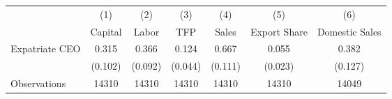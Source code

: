 \begin{tabular}{l*{6}{c}}
\hline\hline
                    &\multicolumn{1}{c}{(1)}&\multicolumn{1}{c}{(2)}&\multicolumn{1}{c}{(3)}&\multicolumn{1}{c}{(4)}&\multicolumn{1}{c}{(5)}&\multicolumn{1}{c}{(6)}\\
                    &\multicolumn{1}{c}{Capital}&\multicolumn{1}{c}{Labor}&\multicolumn{1}{c}{TFP}&\multicolumn{1}{c}{Sales}&\multicolumn{1}{c}{Export Share}&\multicolumn{1}{c}{Domestic Sales}\\
\hline
Expatriate CEO      &       0.315&       0.366&       0.124&       0.667&       0.055&       0.382\\
                    &     (0.102)&     (0.092)&     (0.044)&     (0.111)&     (0.023)&     (0.127)\\
\hline
Observations        &       14310&       14310&       14310&       14310&       14310&       14049\\
\hline\hline
\end{tabular}
